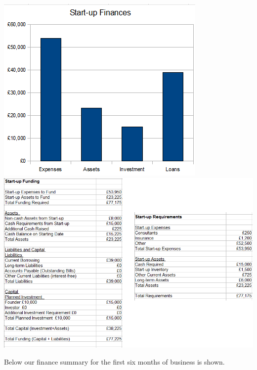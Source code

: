 \documentclass{article}
\begin{document}
\includegraphics[scale=0.7]{startupFinance.png} \\
\includegraphics[scale=0.5]{startupFinanceData.png}

Below our finance summary for the first six months of business is shown.
\end{document}

